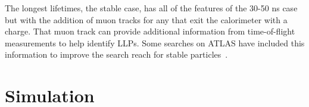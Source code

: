 The longest lifetimes, the stable case, has all of the features of the 30-50 ns case but with the addition of muon tracks for any \rhadrons that exit the calorimeter with a charge.
That muon track can provide additional information from time-of-flight measurements to help identify \acp{LLP}.
Some searches on \ac{ATLAS} have included this information to improve the search reach for stable particles~\cite{SUSY-2013-22, stable2016}.



\section{Simulation}

